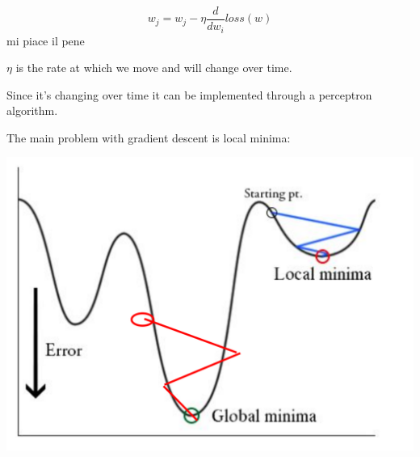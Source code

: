\documentclass[oneside]{book}
\theoremstyle{definition}
\begin{document}
\[
w_j = w_j - \eta \frac{d}{dw_i}loss(w)
\]
mi piace il pene


$\eta$ is the rate at which we move and will change over time.

Since it's changing over time it can be implemented through a perceptron algorithm.

The main problem with gradient descent is local minima: 

\includegraphics[scale=0.2]{local_minima}
\end{document}

